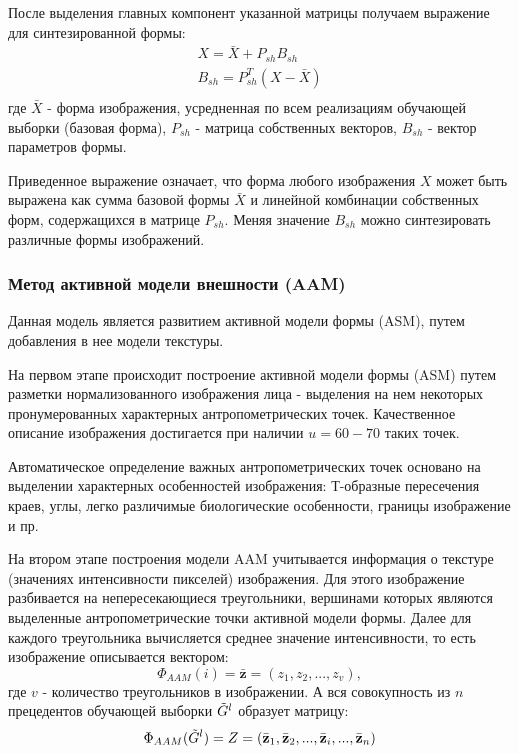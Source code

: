 \documentclass[12pt,a4paper]{article}
\begin{document}
После выделения главных компонент указанной матрицы получаем выражение для синтезированной формы:
\begin{equation}
    \begin{array}{cc}
        X=\bar{X}+P_{sh}B_{sh}\\
        B_{sh}=P_{sh}^T(X-\bar{X})\\
    \end{array}
\end{equation}
где $\bar{X}$ - форма изображения, усредненная по всем реализациям обучающей выборки (базовая форма), $P_{sh}$ - матрица собственных векторов, $B_{sh}$ - вектор параметров формы.

Приведенное выражение означает, что форма любого изображения $X$ может быть выражена как сумма базовой формы $\bar{X}$ и линейной комбинации собственных форм, содержащихся в матрице $P_{sh}$. Меняя значение $B_{sh}$ можно синтезировать различные формы изображений.

\subsubsection{Метод активной модели внешности (AAM)}
Данная модель является развитием активной модели формы (ASM), путем добавления в нее модели текстуры.

На первом этапе происходит построение активной модели формы (ASM) путем разметки нормализованного изображения лица - выделения на нем некоторых пронумерованных характерных антропометрических точек. Качественное описание изображения достигается при наличии $u=60-70$ таких точек.

Автоматическое определение важных антропометрических точек основано на выделении характерных особенностей изображения: Т-образные пересечения краев, углы, легко различимые биологические особенности, границы изображение и пр.

На втором этапе построения модели AAM учитывается информация о текстуре (значениях интенсивности пикселей) изображения. Для этого изображение разбивается на непересекающиеся треугольники, вершинами которых являются выделенные антропометрические точки активной модели формы. Далее для каждого треугольника вычисляется среднее значение интенсивности, то есть изображение описывается вектором:
\begin{equation}
    \Phi_{AAM}(i)=\bar{\textbf{z}}=(z_1,z_2,...,z_v),
\end{equation}
где $v$ - количество треугольников в изображении. А вся совокупность из $n$ прецедентов обучающей выборки $\Tilde{G}^l$ образует матрицу:
\begin{equation}
    \Phi_{AAM}(\Tilde{G}^l)=Z=(\bar{\textbf{z}}_1,\bar{\textbf{z}}_2,...,\bar{\textbf{z}}_i,...,\bar{\textbf{z}}_n)
\end{equation}
\end{document}

